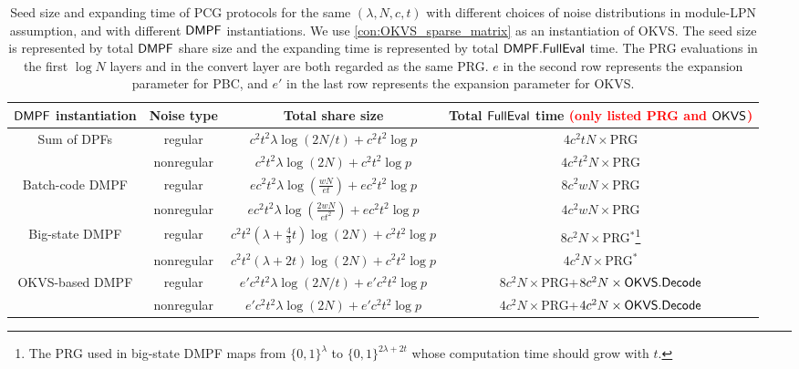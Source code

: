 \begin{table*}
    \renewcommand\arraystretch{1.5}
    \caption{Seed size and expanding time of PCG protocols for the same $(\lambda,N, c, t)$ with different choices of noise distributions in module-LPN assumption, and with different ${\sf DMPF}$ instantiations. We use \cref{con:OKVS_sparse_matrix} as an instantiation of OKVS. The seed size is represented by total ${\sf DMPF}$ share size and the expanding time is represented by total ${\sf DMPF}.{\sf FullEval}$ time. The PRG evaluations in the first $\log N$ layers and in the convert layer are both regarded as the same PRG. $e$ in the second row represents the expansion parameter for PBC, and $e'$ in the last row represents the expansion parameter for OKVS. }
	\label{tab:LPN_error_distribution}
		\begin{tabular}{cccc}
            \toprule
			${\sf DMPF}$ instantiation & Noise type & Total share size & Total ${\sf FullEval}$ time \textcolor{red}{(only listed PRG and ${\sf OKVS}$)} \\
            \midrule

            \multirow{2}{*}{Sum of DPFs} & regular & $c^2t^2\lambda\log(2N/t)+c^2t^2\log p$ & $4c^2tN\times$PRG \\
             & nonregular & $c^2t^2\lambda\log(2N)+c^2t^2\log p$ & $4c^2t^2N\times$PRG\\
             \cline{1-4}
            \multirow{2}{*}{Batch-code DMPF} & regular & $ec^2t^2\lambda\log(\frac{wN}{et})+ec^2t^2\log p$ & $8c^2wN\times$PRG \\
            & nonregular & $ec^2t^2\lambda\log(\frac{2wN}{et^2})+ec^2t^2\log p$ & $4c^2wN\times$PRG\\
            \cline{1-4}

            \multirow{2}{*}{Big-state DMPF} & regular & $c^2t^2(\lambda+\frac{4}{3}t)\log (2N)+c^2t^2\log p$ & $8c^2N\times$PRG$^*$\footnote{The PRG used in big-state DMPF maps from $\{0,1\}^\lambda$ to $\{0,1\}^{2\lambda+2t}$ whose computation time should grow with $t$. } \\
            & nonregular & $c^2t^2(\lambda+2t)\log (2N)+c^2t^2\log p$ & $4c^2N\times$PRG$^*$ \\
            \cline{1-4}

            \multirow{2}{*}{OKVS-based DMPF} & regular & $e'c^2t^2\lambda\log(2N/t)+e'c^2t^2\log p$ & $8c^2N\times$PRG+$8c^2N\times{\sf OKVS}.{\sf Decode}$  \\
            & nonregular & $e'c^2t^2\lambda\log(2N)+e'c^2t^2\log p$ & $4c^2N\times$PRG+$4c^2N\times{\sf OKVS}.{\sf Decode}$\\
            \bottomrule
		\end{tabular}
\end{table*}

